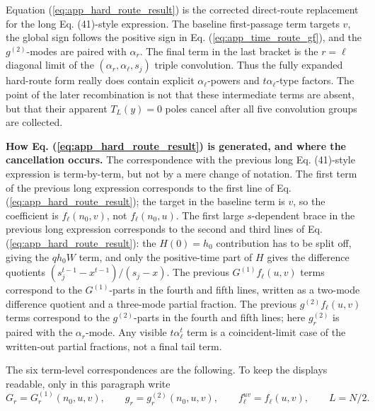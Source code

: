 \documentclass[superscriptaddress, amsmath, amssymb, aps, pre, floatfix]{revtex4-2}
\begin{document}
\endgroup
Equation (\ref{eq:app_hard_route_result}) is the corrected direct-route replacement for the long Eq. (41)-style expression.  The baseline first-passage term targets \(v\), the global sign follows the positive sign in Eq. (\ref{eq:app_time_route_gf}), and the \(g^{(2)}\)-modes are paired with \(\alpha_r\).  The final term in the last bracket is the \(r=\ell\) diagonal limit of the \((\alpha_r,\alpha_\ell,s_j)\) triple convolution.  Thus the fully expanded hard-route form really does contain explicit \(\alpha_\ell\)-powers and \(t\alpha_\ell\)-type factors.  The point of the later recombination is not that these intermediate terms are absent, but that their apparent \(T_L(y)=0\) poles cancel after all five convolution groups are collected.

\medskip
\noindent\textbf{How Eq. (\ref{eq:app_hard_route_result}) is generated, and where the cancellation occurs.}
The correspondence with the previous long Eq. (41)-style expression is term-by-term, but not by a mere change of notation.  The first term of the previous long expression corresponds to the first line of Eq. (\ref{eq:app_hard_route_result}); the target in the baseline term is \(v\), so the coefficient is \(f_\ell(n_0,v)\), not \(f_\ell(n_0,u)\).  The first large \(s\)-dependent brace in the previous long expression corresponds to the second and third lines of Eq. (\ref{eq:app_hard_route_result}): the \(H(0)=h_0\) contribution has to be split off, giving the \(q h_0 W\) term, and only the positive-time part of \(H\) gives the difference quotients \((s_j^{t-1}-x^{t-1})/(s_j-x)\).  The previous \(G^{(1)}f_\ell(u,v)\) terms correspond to the \(G^{(1)}\)-parts in the fourth and fifth lines, written as a two-mode difference quotient and a three-mode partial fraction.  The previous \(g^{(2)}f_\ell(u,v)\) terms correspond to the \(g^{(2)}\)-parts in the fourth and fifth lines; here \(g^{(2)}_r\) is paired with the \(\alpha_r\)-mode.  Any visible \(t\alpha_\ell^t\) term is a coincident-limit case of the written-out partial fractions, not a final tail term.

The six term-level correspondences are the following.  To keep the displays readable, only in this paragraph write
\[
  G_r=G^{(1)}_r(n_0,u,v),\qquad
  g_r=g^{(2)}_r(n_0,u,v),\qquad
  f_\ell^{uv}=f_\ell(u,v),
  \qquad L=N/2.
\]
\end{document}
